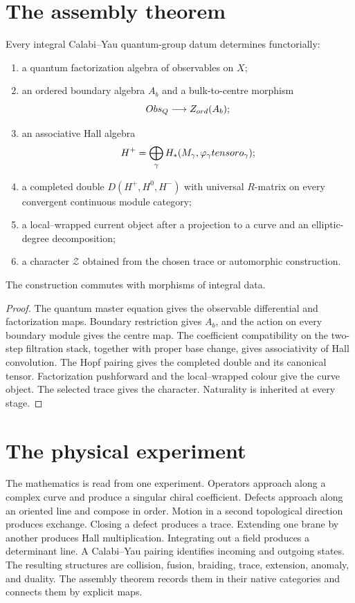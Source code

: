 \chapter{The assembly theorem}
\begin{theorem}
Every integral Calabi--Yau quantum-group datum determines functorially:
\begin{enumerate}
\item a quantum factorization algebra of observables on $X$;
\item an ordered boundary algebra $A_b$ and a bulk-to-centre morphism
\[
 Obs_Q\longrightarrow Z_{ord}(A_b);
\]
\item an associative Hall algebra
\[
 H^+=\bigoplus_\gamma H_*(M_\gamma,\varphi_\gamma tensor o_\gamma);
\]
\item a completed double $D(H^+,H^0,H^-)$ with universal $R$-matrix on every convergent continuous module category;
\item a local--wrapped current object after a projection to a curve and an elliptic-degree decomposition;
\item a character $\mathcal Z$ obtained from the chosen trace or automorphic construction.
\end{enumerate}
The construction commutes with morphisms of integral data.
\end{theorem}
\begin{proof}
The quantum master equation gives the observable differential and factorization maps.  Boundary restriction gives $A_b$, and the action on every boundary module gives the centre map.  The coefficient compatibility on the two-step filtration stack, together with proper base change, gives associativity of Hall convolution.  The Hopf pairing gives the completed double and its canonical tensor.  Factorization pushforward and the local--wrapped colour give the curve object.  The selected trace gives the character.  Naturality is inherited at every stage.
\end{proof}

\chapter{The physical experiment}
The mathematics is read from one experiment.  Operators approach along a complex curve and produce a singular chiral coefficient.  Defects approach along an oriented line and compose in order.  Motion in a second topological direction produces exchange.  Closing a defect produces a trace.  Extending one brane by another produces Hall multiplication.  Integrating out a field produces a determinant line.  A Calabi--Yau pairing identifies incoming and outgoing states.  The resulting structures are collision, fusion, braiding, trace, extension, anomaly, and duality.  The assembly theorem records them in their native categories and connects them by explicit maps.
